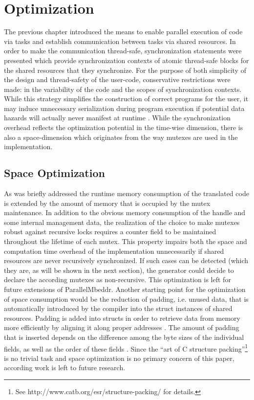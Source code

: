 \chapter{Optimization}
\label{optimization}
The previous chapter introduced the means to enable parallel execution of code via tasks and establish communication between tasks via shared resources. In order to make the communication thread-safe, synchronization statements were presented which provide synchronization contexts of atomic thread-safe blocks for the shared resources that they synchronize. For the purpose of both simplicity of the design and thread-safety of the user-code, conservative restrictions were made: in the variability of the code and the scopes of synchronization contexts. While this strategy simplifies the construction of correct programs for the user, it may induce unnecessary serialization during program execution if potential data hazards will actually never manifest at runtime \cite{SpeculativeLockElision}. While the synchronization overhead reflects the optimization potential in the time-wise dimension, there is also a space-dimension which originates from the way mutexes are used in the implementation. 

\section{Space Optimization}
As was briefly addressed the runtime memory consumption of the translated code is extended by the amount of memory that is occupied by the mutex maintenance. In addition to the obvious memory consumption of the handle and some internal management data, the realization of the choice to make mutexes robust against recursive locks requires a counter field to be maintained throughout the lifetime of each mutex. This property impairs both the space and computation time overhead of the implementation unnecessarily if shared resources are never recursively synchronized. If such cases can be detected (which they are, as will be shown in the next section), the generator could decide to declare the according mutexes as non-recursive. This optimization is left for future extensions of ParallelMbeddr. Another starting point for the optimization of space consumption would be the reduction of padding, i.e. unused data, that is automatically introduced by the compiler into the struct instances of shared resources. Padding is added into structs in order to retrieve data from memory more efficiently by aligning it along proper addresses \cite[p.~27]{MemoryAsAProgrammingConcept}. The amount of padding that is inserted depends on the difference among the byte sizes of the individual fields, as well as the order of these fields \cite{MemoryAsAProgrammingConcept}. Since the ``art of C structure packing''\footnote{See http://www.catb.org/esr/structure-packing/ for details.} is no trivial task and space optimization is no primary concern of this paper, according work is left to future research.



